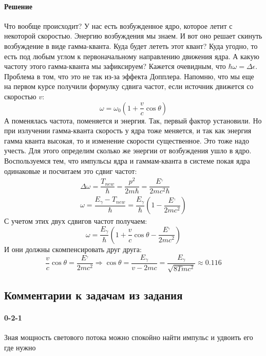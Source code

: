 \documentclass[12pt]{article}
\begin{document}
\paragraph{Решение}
Что вообще происходит? У нас есть возбужденное ядро, которое летит с некоторой скоростью. Энергию возбуждения мы знаем. И вот оно решает скинуть возбуждение в виде гамма-кванта. Куда будет лететь этот квант? Куда угодно, то есть под любым углом к первоначальному направлению движения ядра. А какую частоту этого гамма-кванта мы зафиксируем? Кажется очевидным, что $\hbar\omega = \Delta \epsilon$. Проблема в том, что это не так из-за эффекта Допплера. Напомню, что мы еще на первом курсе получили формулку сдвига частот, если источник движется со скоростью $v$:
\begin{equation*}
    \omega = \omega_0 \left(1+ \dfrac{v}{c}\cos{\theta} \right)
\end{equation*}
А поменялась частота, поменяется и энергия. Так, первый фактор установили. Но при излучении гамма-кванта скорость у ядра тоже меняется, и так как энергия гамма кванта высокая, то и изменение скорости существенное. Это тоже надо учесть. Для этого определим сколько же энергии от возбуждения ушло в ядро. Воспользуемся тем, что импульсы ядра и гаммам-кванта в системе покая ядра одинаковые и посчитаем это сдвиг частот:
\begin{gather*}
    \Delta\omega = \dfrac{T_{new}}{\hbar} =  \dfrac{p^2}{2m\hbar} = \dfrac{E^_{\gamma}}{2mc^2\hbar}\\
    \omega = \dfrac{E_{\gamma} - T_{new}}{\hbar} = \dfrac{E_{\gamma}}{\hbar}(1-\dfrac{E^_{\gamma}}{2mc^2})
\end{gather*}
С учетом этих двух сдвигов частот получаем:
\begin{equation*}
    \omega = \dfrac{E_{\gamma}}{\hbar} \left(1+ \dfrac{v}{c}\cos{\theta} - \dfrac{E^_{\gamma}}{2mc^2}\right)
\end{equation*}
И они должны скомпенсировать друг друга:
\begin{equation*}
    \dfrac{v}{c}\cos{\theta} = \dfrac{E^_{\gamma}}{2mc^2} \Rightarrow \cos{\theta} = \dfrac{E_\gamma}{v-2mc} = \dfrac{E_\gamma}{\sqrt{8Tmc^2}} \approx 0.116
\end{equation*}


\subsection{Комментарии к задачам из задания}
\paragraph{0-2-1} Зная мощность светового потока можно спокойно найти импульс и удвоить его где нужно
\end{document}
